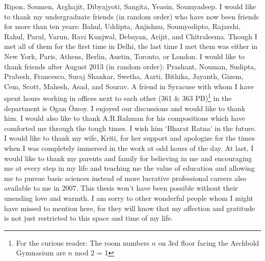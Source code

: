 Ripon, Soumen, Arghajit, Dibyajyoti, Sangita, Yeasin, Soumyadeep. 
I would like to thank my undergraduate friends (in random order) who have now been friends for 
more than ten years: Bahul, Uddipta, Anjishnu, Soumyodipto, Rajarshi, Rahul, Parul, Varun, 
Ravi Kunjwal, Debayan, Arijit, and Chitraleema. Though I met all of them for the first time in Delhi, the 
last time I met them was either in 
New York, Paris, Athens, Berlin, Austin, Toronto, or London. I would like to thank friends after 
August 2013 (in random order): Prashant, Nouman, Sudipta, Prabesh, Francesco, Suraj Shankar, Swetha, 
Aarti, Bithika, Jayanth, Gizem, Cem, Scott, Mahesh, Asad, and Sourav. 
A friend in Syracuse with whom I have spent hours working in offices next to each 
other (361 \& 363 PB)\footnote{For the curious reader: The room numbers $n$ on 3rd floor facing the 
Archbold Gymnasium are $\textit{n}$ mod 2 = 1} in 
the department is Ogan \"{O}zsoy. I enjoyed our discussions and would like to thank him. I would 
also like to thank A.R.Rahman for his compositions which have comforted me through the tough times. 
I wish him `Bharat Ratna' in the future. I would like to thank my wife, Kriti, for her support and 
apologize for the times when I was completely immersed in the work at odd 
hours of the day. At last, I would like to thank my parents and family for believing in me and encouraging me 
at every step in my life and teaching me the value of education and allowing me to pursue basic sciences 
instead of more lucrative professional careers also available to me in 2007. This thesis won't have been possible 
without their unending love and warmth. I am sorry to other wonderful people whom I might have missed to 
mention here, for they will know that my affection and gratitude is not just restricted to this space and time 
of my life.
